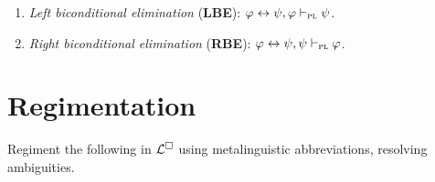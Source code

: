 \documentclass[a4paper, 11pt]{article}                  %
\begin{document}
\begin{enumerate}
	\item \textit{Left biconditional elimination} (\textbf{LBE}): $\varphi \leftrightarrow \psi, \varphi \vdash_{\textsc{pl}} \psi$.
	      \answer
	      {}

	\item \textit{Right biconditional elimination} (\textbf{RBE}): $\varphi \leftrightarrow \psi, \psi \vdash_{\textsc{pl}} \varphi$.
	      \answer
	      {}

\end{enumerate}





\section{Regimentation}

Regiment the following in $\mathcal{L}^{\square}$ using metalinguistic abbreviations, resolving ambiguities.
\end{document}
